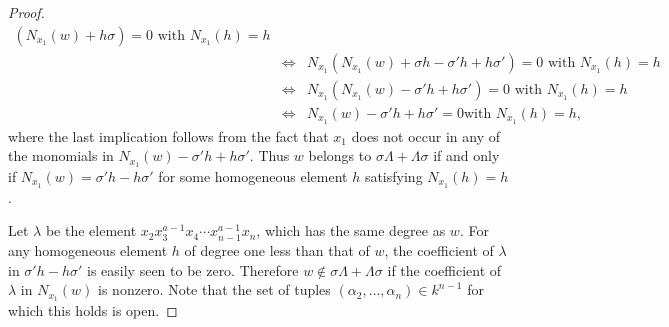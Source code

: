 \documentclass[a4paper]{amsart}
\theoremstyle{definition}
\theoremstyle{definition}
\theoremstyle{definition}
\theoremstyle{definition}
\theoremstyle{definition}
\theoremstyle{definition}
\theoremstyle{remark}
\theoremstyle{remark}
\theoremstyle{definition}
\theoremstyle{definition}
\begin{document}
\begin{proof}
\begin{eqnarray*}
\left ( N_{x_1}(w) + h \sigma \right ) =0 \text{ with } N_{x_1}(h)=h \\
& \Leftrightarrow & N_{x_1} \left ( N_{x_1}(w) + \sigma h -
\sigma' h + h \sigma' \right ) =0 \text{ with } N_{x_1}(h)=h \\
& \Leftrightarrow & N_{x_1} \left ( N_{x_1}(w) - \sigma' h + h
\sigma' \right ) =0 \text{ with } N_{x_1}(h)=h  \\
& \Leftrightarrow & N_{x_1}(w) - \sigma' h + h \sigma' =0 \text{
with } N_{x_1}(h)=h,
\end{eqnarray*}
where the last implication follows from the fact that $x_1$ does not
occur in any of the monomials in $N_{x_1}(w) - \sigma' h + h
\sigma'$. Thus $w$ belongs to $\sigma \Lambda + \Lambda \sigma$ if
and only if $N_{x_1}(w) = \sigma' h - h \sigma'$ for some
homogeneous element $h$ satisfying $N_{x_1}(h)=h$.

Let $\lambda$ be the element $x_2x_3^{a-1}x_4 \cdots
x_{n-1}^{a-1}x_n$, which has the same degree as $w$. For any
homogeneous element $h$ of degree one less than that of $w$, the
coefficient of $\lambda$ in $\sigma' h - h \sigma'$ is easily seen
to be zero. Therefore $w \notin \sigma \Lambda + \Lambda \sigma$ if
the coefficient of $\lambda$ in $N_{x_1}(w)$ is nonzero. Note that
the set of tuples $(\alpha_2, \dots, \alpha_n) \in k^{n-1}$ for
which this holds is open.


\end{proof}
\end{document}
